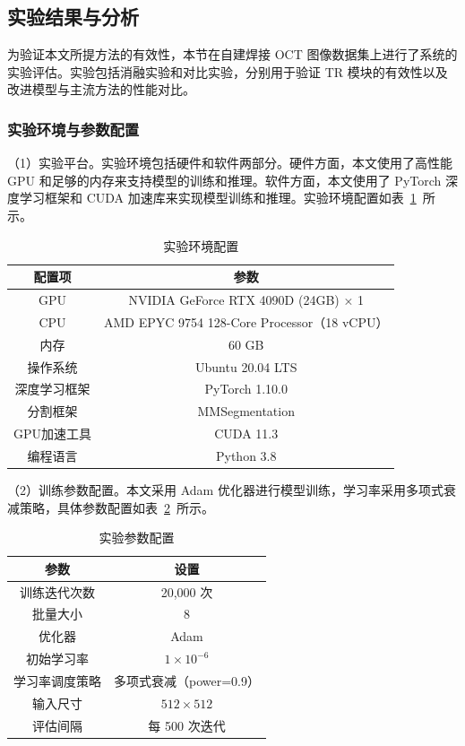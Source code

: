 \subsection{实验结果与分析}

为验证本文所提方法的有效性，本节在自建焊接 OCT 图像数据集上进行了系统的实验评估。实验包括消融实验和对比实验，分别用于验证 TR 模块的有效性以及改进模型与主流方法的性能对比。

\subsubsection{实验环境与参数配置}

（1）实验平台。实验环境包括硬件和软件两部分。硬件方面，本文使用了高性能 GPU 和足够的内存来支持模型的训练和推理。软件方面，本文使用了 PyTorch 深度学习框架和 CUDA 加速库来实现模型训练和推理。实验环境配置如表~\ref{tab:env_config}~所示。

\begin{table}[htbp]
\centering
\caption{实验环境配置}
\label{tab:env_config}
\begin{tabular}{cc}
\toprule
配置项 & 参数 \\
\midrule
GPU & NVIDIA GeForce RTX 4090D (24GB) × 1 \\
CPU & AMD EPYC 9754 128-Core Processor（18 vCPU） \\
内存 & 60 GB \\
操作系统 & Ubuntu 20.04 LTS \\
深度学习框架 & PyTorch 1.10.0 \\
分割框架 & MMSegmentation \\
GPU加速工具 & CUDA 11.3 \\
编程语言 & Python 3.8 \\
\bottomrule
\end{tabular}
\end{table}

（2）训练参数配置。本文采用 Adam 优化器进行模型训练，学习率采用多项式衰减策略，具体参数配置如表~\ref{tab:train_config}~所示。

\begin{table}[htbp]
\centering
\caption{实验参数配置}
\label{tab:train_config}
\begin{tabular}{cc}
\toprule
参数 & 设置 \\
\midrule
训练迭代次数 & 20,000 次 \\
批量大小 & 8 \\
优化器 & Adam \\
初始学习率 & $1 \times 10^{-6}$ \\
学习率调度策略 & 多项式衰减（power=0.9） \\
输入尺寸 & $512 \times 512$ \\
评估间隔 & 每 500 次迭代 \\
\bottomrule
\end{tabular}
\end{table}


